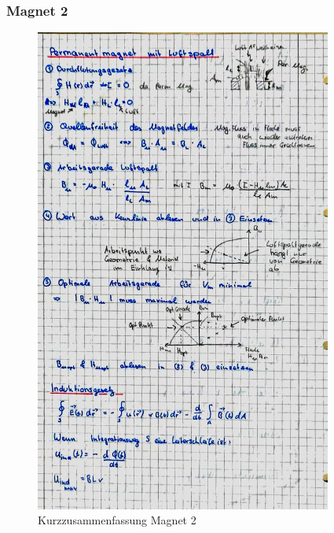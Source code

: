 \documentclass[12pt,a4paper]{article}%
\numberwithin{equation}{section}
\numberwithin{equation}{subsection}
\begin{document}
  \subsubsection{Magnet 2}
\begin{figure}[H] 
	  \centering
	  \includegraphics[width=0.87\textwidth]{4_Magnet_2.jpg}
	  \caption{Kurzzusammenfassung Magnet 2}
	  \label{fig:magnet_2}
  \end{figure}
  \newpage
\end{document}
